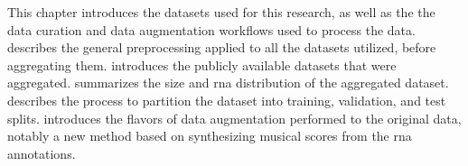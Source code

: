 
This chapter introduces the datasets used for this research,
as well as the the data curation and data augmentation
workflows used to process the data.
 describes the general
preprocessing applied to all the datasets utilized, before
aggregating them. 
introduces the publicly available datasets that were
aggregated.  summarizes the
size and \gls{rna} distribution of the aggregated dataset.
describes the process to partition the dataset into
training, validation, and test splits.
 introduces the flavors of data
augmentation performed to the original data, notably a new
method based on synthesizing musical scores from the
\gls{rna} annotations.
